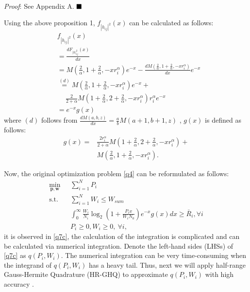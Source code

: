 \documentclass[journal]{IEEEtran}
\begin{document}
\textit{Proof}: See Appendix A.  $\hfill\blacksquare$

Using the above proposition 1, $f_{\left|h_{ij} \right|^2} \left(x\right)$ can be calculated as follows:
\begin{align}
&f_{\left|h_{ij} \right|^2} \left(x\right)\nonumber \\ &= \frac{d F_{\left|h\right|_{ij}^2}\left(x\right)}{d x} \nonumber \\
&=M\left(\frac{2}{\alpha}, 1 + \frac{2}{\alpha}, -xr_i^{\alpha}\right)e^{-x} -\frac{d M\left(\frac{2}{\alpha}, 1 + \frac{2}{\alpha}, -x r_i^{\alpha}\right)}{d x} e^{-x} \nonumber \\
&\overset{\left(d\right)}{=} M\left(\frac{2}{\alpha}, 1 + \frac{2}{\alpha}, -xr_i^{\alpha}\right)e^{-x} + \nonumber \\ & \quad \ \frac{2}{2+\alpha}M\left(1 + \frac{2}{\alpha}, 2+\frac{2}{\alpha}, -xr_i^{\alpha}\right)r_i^{\alpha}e^{-x} \nonumber \\
& = e^{-x}g\left(x\right)
\end{align}
where $\left(d\right)$ follows from $\frac{d M\left(a, b, z\right)}{d x} = \frac{a}{b}M\left(a+1, b+1, z\right)$ \cite[13.4.8]{MAbramowitz}, $g\left(x\right)$ is defined as follows:
\begin{align}
g\left(x\right) =& \frac{2r_i^{\alpha}}{2+\alpha} M\left(1 + \frac{2}{\alpha}, 2+ \frac{2}{\alpha}, -xr_i^{\alpha}\right) + \nonumber \\ & M\left(\frac{2}{\alpha}, 1 + \frac{2}{\alpha}, -xr_i^{\alpha}\right).
\end{align}

Now, the original optimization problem \eqref{q4} can be reformulated as follows:
\begin{subequations}\label{q7}
	\begin{align}
	\min_{\mathbf{p}, \mathbf{w}}\ & \sum\limits_{i = 1}^{N} P_i \label{q7a} \\ \mbox{s.t.} \quad &  \sum\limits_{i = 1}^{N} W_i \leq W_{sum} \label{q7b} \\ \quad &  \int_{0}^{\infty} \frac{W_i}{N_i} \log_2\left(1 + \frac{P_i x}{W_i N_0}\right) e^{-x}g\left(x\right) dx \geq \bar{R}_i, \forall i \label{q7c}\\
	& P_i \geq 0, W_i \geq 0, \ \forall i, \label{q7d}
	\end{align}
\end{subequations}
it is observed in \eqref{q7c}, the calculation of the integration is complicated and can be calculated via numerical integration. Denote the left-hand sides (LHSs) of \eqref{q7c} as $q\left(P_i, W_i\right)$. The numerical integration can be very time-consuming when the integrand of $q\left(P_i, W_i\right)$ has a heavy tail. Thus, next we will apply half-range Gauss-Hermite Quadrature (HR-GHQ) to approximate $q\left(P_i, W_i\right)$ with high accuracy \cite{JSBall,NMSteen}.
\end{document}
